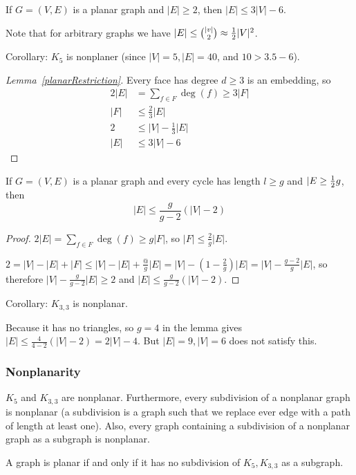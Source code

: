 \documentclass[12pt]{article}
\begin{document}
\begin{lemma}
\label{planarRestriction}
If $G = (V,E)$ is a planar graph and $|E| \geq 2$, then $|E| \leq 3|V| - 6$.
\end{lemma}

Note that for arbitrary graphs we have $|E| \leq {|v| \choose 2} \approx \frac{1}{2} |V|^2$.

Corollary: $K_5$ is nonplaner (since $|V| = 5, |E| = 40$, and $10 > 3.5 - 6$).

\begin{proof}[Lemma~\ref{planarRestriction}]
Every face has degree $d \geq 3$ is an embedding, so
\begin{align*}
2|E| &= \displaystyle\sum_{f\in F} \deg(f) \geq 3|F|\\
|F| &\leq \frac{2}{3}|E|\\
2 &\leq |V| - \frac{1}{3}|E|\\
|E| &\leq 3|V| - 6
\end{align*}
\end{proof}

\begin{lemma}
If $G = (V,E)$ is a planar graph and every cycle has length $l \geq g$ and $|E \geq \frac{1}{2} g$, then \[ |E| \leq \frac{g}{g-2}(|V| - 2) \]
\end{lemma}

\begin{proof}
$2|E| = \displaystyle\sum_{f\in F} \deg(f) \geq g|F|$, so $|F| \leq \frac{2}{g} |E|$.

$2 = |V| - |E| + |F| \leq |V| - |E| + \frac{@}{g}|E| = |V| - (1-\frac{2}{g})|E| = |V| - \frac{g-2}{g}|E|$, so therefore $|V| - \frac{g}{g-2}|E| \geq 2$ and $|E| \leq \frac{g}{g-2}(|V| - 2)$.
\end{proof}

Corollary: $K_{3,3}$ is nonplanar.

Because it has no triangles, so $g=4$ in the lemma gives $|E| \leq \frac{4}{4-2}(|V| - 2) = 2|V| - 4$. But $|E| = 9, |V| = 6$ does not satisfy this.

\subsubsection{Nonplanarity}
$K_5$ and $K_{3,3}$ are nonplanar. Furthermore, every subdivision of a nonplanar graph is nonplanar (a subdivision is a graph such that we replace ever edge with a path of length at least one). Also, every graph containing a subdivision of a nonplanar graph as a subgraph is nonplanar.

\begin{theorem}
A graph is planar if and only if it has no subdivision of $K_5, K_{3,3}$ as a subgraph.
\end{theorem}
\end{document}
